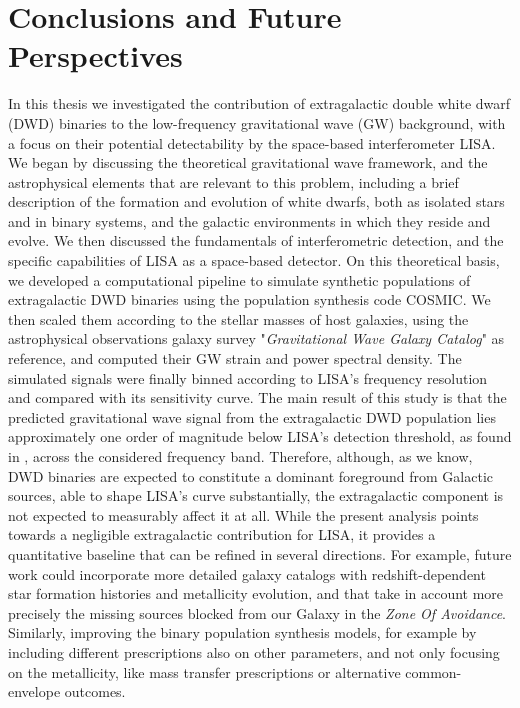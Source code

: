 \chapter*{Conclusions and Future Perspectives}
In this thesis we investigated the contribution of extragalactic double white dwarf (DWD) binaries to the low-frequency gravitational wave (GW) background, with a focus on their potential detectability by the space-based interferometer LISA.  
We began by discussing the theoretical gravitational wave framework, and the astrophysical elements that are relevant to this problem, including a brief description of the formation and evolution of white dwarfs, both as isolated stars and in binary systems, and the galactic environments in which they reside and evolve. 
We then discussed the fundamentals of interferometric detection, and the specific capabilities of LISA as a space-based detector.  
On this theoretical basis, we developed a computational pipeline to simulate synthetic populations of extragalactic DWD binaries using the population synthesis code COSMIC. 
We then scaled them according to the stellar masses of host galaxies, using the astrophysical observations galaxy survey "\textit{Gravitational Wave Galaxy Catalog}" as reference, and computed their GW strain and power spectral density. 
The simulated signals were finally binned according to LISA’s frequency resolution and compared with its sensitivity curve.
The main result of this study is that the predicted gravitational wave signal from the extragalactic DWD population lies approximately one order of magnitude below LISA’s detection threshold, as found in \cite{Robson_2019}, across the considered frequency band.  
Therefore, although, as we know, DWD binaries are expected to constitute a dominant foreground from Galactic sources, able to shape LISA's curve substantially, the extragalactic component is not expected to measurably affect it at all.
While the present analysis points towards a negligible extragalactic contribution for LISA, it provides a quantitative baseline that can be refined in several directions.  
For example, future work could incorporate more detailed galaxy catalogs with redshift-dependent star formation histories and metallicity evolution, and that take in account more precisely the missing sources blocked from our Galaxy in the \textit{Zone Of Avoidance}.
Similarly, improving the binary population synthesis models, for example by including different prescriptions also on other parameters, and not only focusing on the metallicity, like mass transfer prescriptions or alternative common-envelope outcomes.
